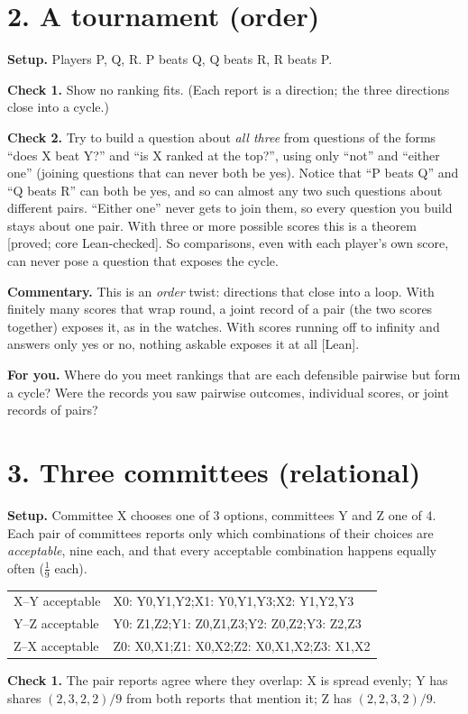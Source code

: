 \documentclass[11pt]{article}
\newcommand{\st}[1]{\textsf{\small[#1]}}
\begin{document}
\section*{2. A tournament (order)}
\textbf{Setup.} Players P, Q, R. P beats Q, Q beats R, R beats P.

\textbf{Check 1.} Show no ranking fits. (Each report is a direction; the three
directions close into a cycle.)

\textbf{Check 2.} Try to build a question about \emph{all three} from questions of
the forms ``does X beat Y?'' and ``is X ranked at the top?'', using only ``not'' and
``either one'' (joining questions that can never both be yes). Notice that ``P
beats Q'' and ``Q beats R'' can both be yes, and so can almost any two such
questions about different pairs. ``Either one'' never gets to join them, so every
question you build stays about one pair. With three or more possible scores this
is a theorem \st{proved; core Lean-checked}. So comparisons, even with each
player's own score, can never pose a question that exposes the cycle.

\textbf{Commentary.} This is an \emph{order} twist: directions that close into a
loop. With finitely many scores that wrap round, a joint record of a pair (the
two scores together) exposes it, as in the watches. With scores running off to
infinity and answers only yes or no, nothing askable exposes it at all
\st{Lean}.

\textbf{For you.} Where do you meet rankings that are each defensible pairwise but
form a cycle? Were the records you saw pairwise outcomes, individual scores, or
joint records of pairs?

\section*{3. Three committees (relational)}
\textbf{Setup.} Committee X chooses one of 3 options, committees Y and Z one of 4.
Each pair of committees reports only which combinations of their choices are
\emph{acceptable}, nine each, and that every acceptable combination happens
equally often ($\tfrac19$ each).
\begin{center}\small
\begin{tabular}{l|l}
X--Y acceptable & X0: Y0,Y1,Y2;\quad X1: Y0,Y1,Y3;\quad X2: Y1,Y2,Y3\\
Y--Z acceptable & Y0: Z1,Z2;\quad Y1: Z0,Z1,Z3;\quad Y2: Z0,Z2;\quad Y3: Z2,Z3\\
Z--X acceptable & Z0: X0,X1;\quad Z1: X0,X2;\quad Z2: X0,X1,X2;\quad Z3: X1,X2
\end{tabular}
\end{center}
\textbf{Check 1.} The pair reports agree where they overlap: X is spread evenly;
Y has shares $(2,3,2,2)/9$ from both reports that mention it; Z has $(2,2,3,2)/9$.
\end{document}

